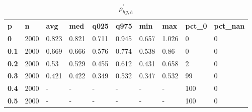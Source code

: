 \begin{table}[h]
 \centering 
\footnotesize
\caption{$\rho_{hg,h}^\prime $}
\label{tab:alphahgh}
\begin{tabular}[h]{| l l l l l l l l l l|
    } \hline
\textbf{ p} & \textbf{ n} & \textbf{ avg} & \textbf{ med} & \textbf{ q025} & \textbf{ q975} & \textbf{ min} & \textbf{ max} & \textbf{ pct\_0} & \textbf{ pct\_nan}
           \\
  \textbf{  0} & 2000 & 0.823 & 0.821 & 0.711 & 0.945 & 0.657 & 1.026 &   0 & 0
           \\
  \textbf{0.1} & 2000 & 0.669 & 0.666 & 0.576 & 0.774 & 0.538 &  0.86 &   0 & 0
           \\
  \textbf{0.2} & 2000 &  0.53 & 0.529 & 0.455 & 0.612 & 0.431 & 0.658 &   2 & 0
           \\
  \textbf{0.3} & 2000 & 0.421 & 0.422 & 0.349 & 0.532 & 0.347 & 0.532 &  99 & 0
           \\
  \textbf{0.4} & 2000 & - & - & - & - & - & - & 100 & 0
           \\
  \textbf{0.5} & 2000 & - & - & - & - & - & - & 100 & 0
           \\
 \hline \end{tabular}
 \end{table}
